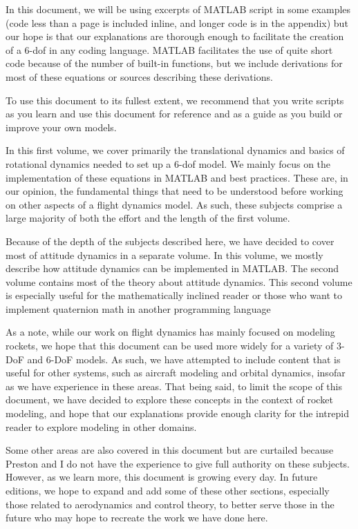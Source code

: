 \documentclass[12pt]{report}
\begin{document}
In this document, we will be using excerpts of MATLAB script in some examples (code less than a page is included inline, and longer code is in the appendix) but our hope is that our explanations are thorough enough to facilitate the creation of a 6-\gls{dof} in any coding language. MATLAB facilitates the use of quite short code because of the number of built-in functions, but we include derivations for most of these equations or sources describing these derivations.

To use this document to its fullest extent, we recommend that you write scripts as you learn and use this document for reference and as a guide as you build or improve your own models.

In this first volume, we cover primarily the translational dynamics and basics of rotational dynamics needed to set up a 6-\gls{dof} model. We mainly focus on the implementation of these equations in MATLAB and best practices. These are, in our opinion, the fundamental things that need to be understood before working on other aspects of a flight dynamics model. As such, these subjects comprise a large majority of both the effort and the length of the first volume.

Because of the depth of the subjects described here, we have decided to cover most of attitude dynamics in a separate volume. In this volume, we mostly describe how attitude dynamics can be implemented in MATLAB. The second volume contains most of the theory about attitude dynamics. This second volume is especially useful for the mathematically inclined reader or those who want to implement quaternion math in another programming language

As a note, while our work on flight dynamics has mainly focused on modeling rockets, we hope that this document can be used more widely for a variety of 3-DoF and 6-DoF models. As such, we have attempted to include content that is useful for other systems, such as aircraft modeling and orbital dynamics, insofar as we have experience in these areas. That being said, to limit the scope of this document, we have decided to explore these concepts in the context of rocket modeling, and hope that our explanations provide enough clarity for the intrepid reader to explore modeling in other domains.

Some other areas are also covered in this document but are curtailed because Preston and I do not have the experience to give full authority on these subjects. However, as we learn more, this document is growing every day. In future editions, we hope to expand and add some of these other sections, especially those related to aerodynamics and control theory, to better serve those in the future who may hope to recreate the work we have done here.
\end{document}
